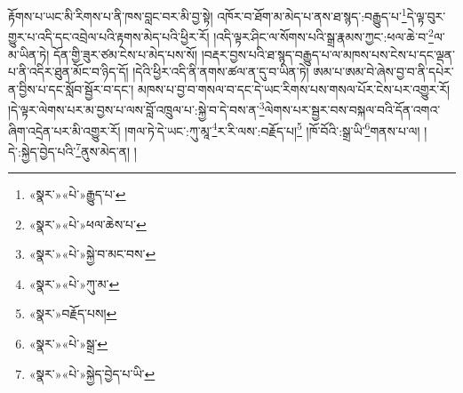 རྟོགས་པ་ཡང་མི་རིགས་པ་ནི་ཁས་བླང་བར་མི་བྱ་སྟེ། འཁོར་བ་ཐོག་མ་མེད་པ་ནས་ཐ་སྙད་:བརྒྱུད་པ་\footnote{«སྣར་»«པེ་»རྒྱུད་པ་}དེ་ལྟ་བུར་གྱུར་པ་འདི་དང་འབྲེལ་པའི་རྟགས་མེད་པའི་ཕྱིར་རོ། །འདི་ལྟར་ཤིང་ལ་སོགས་པའི་སྒྲ་རྣམས་ཀྱང་:ཕལ་ཆེ་བ་\footnote{«སྣར་»«པེ་»ཕལ་ཆེས་པ་}ལ་མ་ཡིན་ཏེ། དོན་གྱི་ཟུར་ཙམ་ངེས་པ་མེད་པས་སོ། །བརྡར་བྱས་པའི་ཐ་སྙད་བརྒྱུད་པ་ལ་མཁས་པས་ངེས་པ་དང་ལྡན་པ་ནི་འདིར་ཐུན་མོང་བ་ཉིད་དོ། །དེའི་ཕྱིར་འདི་ནི་ནགས་ཚལ་ན་དུ་བ་ཡིན་ཏེ། ཨམ་པ་ཨམ་བེ་ཞེས་བྱ་བ་ནི་དཔེར་ན་བྱིས་པ་དང་སློབ་སྦྱོར་བ་དང་། མཁས་པ་བྱ་བ་གསལ་བ་དང་དེ་ཡང་རིགས་པས་གསལ་པོར་ངེས་པར་འགྱུར་རོ། །དེ་ལྟར་ལེགས་པར་མ་བྱས་པ་ལས་བློ་འཁྲུལ་པ་:སྐྱེ་བ་དེ་བས་ན་\footnote{«སྣར་»«པེ་»སྐྱེ་བ་མང་བས་}ལེགས་པར་སྦྱར་བས་བསྐལ་བའི་དོན་འགའ་ཞིག་འདྲེན་པར་མི་འགྱུར་རོ། །གལ་ཏེ་དེ་ཡང་:ཀུ་མཱ་\footnote{«སྣར་»«པེ་»ཀུ་མ་}ར་རི་ལས་:བརྗོད་པ།\footnote{«སྣར་»བརྗོད་པས།} །ཁོ་བོའི་:སྒྲ་ཡི་\footnote{«སྣར་»«པེ་»སྒྲ་}གནས་པ་ལ། །དེ་:སྐྱེད་བྱེད་པའི་\footnote{«སྣར་»«པེ་»སྐྱེད་བྱེད་པ་ཡི་}ནུས་མེད་ན། །
